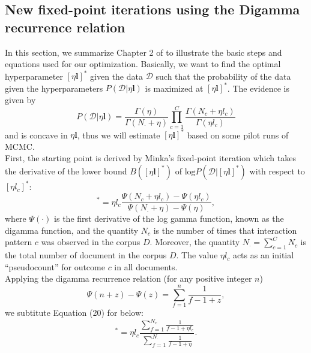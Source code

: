 \documentclass[a4paper]{article}
\begin{document}
\subsection{New fixed-point iterations using the Digamma recurrence relation}
In this section, we summarize Chapter 2 of \cite{wallach2008structured} to illustrate the basic steps and equations used for our optimization. Basically, we want to find the optimal hyperparameter $[\eta\boldsymbol{l}]^*$ given the data $\mathcal{D}$ such that the probability of the
data given the hyperparameters $P(\mathcal{D}|\eta\boldsymbol{l})$ is maximized at $[\eta\boldsymbol{l}]^*$. The evidence is given by 
\begin{equation}
	P(\mathcal{D}|\eta\boldsymbol{l})=\frac{\Gamma(\eta)}{\Gamma(N_{\cdot}+\eta)}\prod_{c=1}^{C}\frac{\Gamma(N_{c}+\eta{l}_c)}{\Gamma(\eta{l}_c)}
\end{equation} and is concave in $\eta\boldsymbol{l}$, thus we will estimate $[\eta\boldsymbol{l}]^*$ based on some pilot runs of MCMC.\\
\newline First, the starting point is derived by Minka’s fixed-point iteration which takes the derivative of the lower bound $B([\eta\boldsymbol{l}]^*)$ of $\mbox{log}P(\mathcal{D}|[\eta\boldsymbol{l}]^*)$ with respect to $[\eta{l}_c]^*$:
\begin{equation}
	[\eta{l}_c]^*=\eta{l}_c\frac{\Psi(N_{c}+\eta{l}_c)-\Psi(\eta{l}_c)}{\Psi(N_{\cdot}+\eta)-\Psi(\eta)},
\end{equation}
where $\Psi(\cdot)$ is the first derivative of the log gamma function, known as the digamma function, and the quantity $N_{c}$ is the number of times that interaction pattern $c$ was observed in the corpus $D$. Moreover, the quantity $N_{\cdot}=\sum_{c=1}^{C} N_{c}$ is the total number of document in the corpus $D$. The
value $\eta{l}_c$ acts as an initial “pseudocount” for outcome $c$ in all documents.\\ \newline
Applying the digamma recurrence relation (for any positive integer $n$) $$\Psi(n+z)-\Psi(z)=\sum_{f=1}^{n}\frac{1}{f-1+z},$$ we subtitute Equation (20) for below:
\begin{equation}
	[\eta{l}_c]^*=\eta{l}_c\frac{\sum_{f=1}^{N_c} \frac{1}{f-1+\eta{l}_c}}{\sum_{f=1}^{N_\cdot}  \frac{1}{f-1+\eta}}.
\end{equation}
\end{document}
